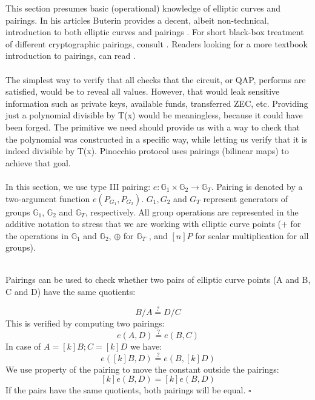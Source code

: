 This section presumes basic (operational) knowledge of elliptic curves and pairings. In his articles Buterin provides a decent, albeit non-technical, introduction to both elliptic curves and pairings \cite{buterin1, buterin2, buterin3}. For short black-box treatment of different cryptographic pairings, consult \cite{galbraith2008pairings}. Readers looking for a more textbook introduction to pairings, can read \cite{costello2012pairings}.\\
\\
The simplest way to verify that all checks that the circuit, or QAP, performs are satisfied, would be to reveal all values. However, that would leak sensitive information such as private keys, available funds, transferred ZEC, etc. Providing just a polynomial divisible by T(x) would be meaningless, because it could have been forged. The primitive we need should provide us with a way to check that the polynomial was constructed in a specific way, while letting us verify that it is indeed divisible by T(x). Pinocchio protocol \cite{parno2013pinocchio} uses  pairings (bilinear maps) to achieve that goal.\\
\\
In this section, we use type III pairing: $e: \mathbb{G}_1 \times \mathbb{G}_2 \to \mathbb{G}_T$. Pairing is denoted by a two-argument function $e(P_{G_1}, P_{G_2})$. $G_1, G_2$ and $G_T$ represent generators of groups $\mathbb{G}_1$, $\mathbb{G}_2$ and $\mathbb{G}_T$, respectively. All group operations are represented in the additive notation to stress that we are working with elliptic curve points (+ for the operations in $\mathbb{G}_1$ and $\mathbb{G}_2$, $\oplus$ for $\mathbb{G}_T$ , and $[n]P$ for scalar multiplication for all groups).\\
\\
\begin{exmp}
    \label{pairingexample}
    Pairings can be used to check whether two pairs of elliptic curve points (A and B, C and D) have the same quotients:

    $$ B / A \stackrel{?}{=} D / C $$
    This is verified by computing two pairings:
    $$ e(A, D) \stackrel{?}{=} e(B, C) $$
    In case of $A = [k]B; C = [k]D$ we have:
    $$ e([k]B, D) \stackrel{?}{=} e(B, [k]D)$$
    We use property of the pairing to move the constant outside the pairings:
    $$ [k]e(B, D) = [k]e(B, D) $$
    If the pairs have the same quotients, both pairings will be equal. $\square$
\end{exmp}

